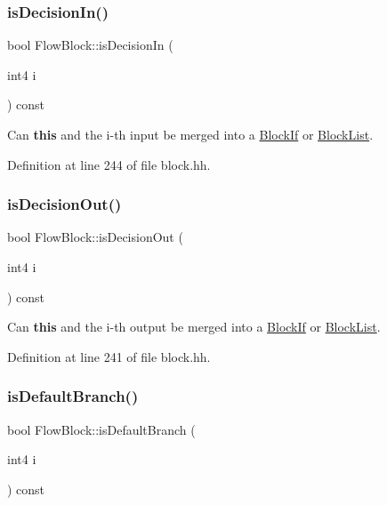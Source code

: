 \subsubsection{\texorpdfstring{isDecisionIn()}{isDecisionIn()}}
{\footnotesize\ttfamily bool Flow\+Block\+::is\+Decision\+In (\begin{DoxyParamCaption}\item[{int4}]{i }\end{DoxyParamCaption}) const\hspace{0.3cm}{\ttfamily [inline]}}



Can {\bfseries{this}} and the i-\/th input be merged into a \mbox{\hyperlink{class_block_if}{Block\+If}} or \mbox{\hyperlink{class_block_list}{Block\+List}}. 



Definition at line 244 of file block.\+hh.

\mbox{\label{class_flow_block_a96f1d86554ed27136413d992238356f1}} 
\subsubsection{\texorpdfstring{isDecisionOut()}{isDecisionOut()}}
{\footnotesize\ttfamily bool Flow\+Block\+::is\+Decision\+Out (\begin{DoxyParamCaption}\item[{int4}]{i }\end{DoxyParamCaption}) const\hspace{0.3cm}{\ttfamily [inline]}}



Can {\bfseries{this}} and the i-\/th output be merged into a \mbox{\hyperlink{class_block_if}{Block\+If}} or \mbox{\hyperlink{class_block_list}{Block\+List}}. 



Definition at line 241 of file block.\+hh.

\mbox{\label{class_flow_block_a597d04517618311c838f3c25bdbb02a9}} 
\subsubsection{\texorpdfstring{isDefaultBranch()}{isDefaultBranch()}}
{\footnotesize\ttfamily bool Flow\+Block\+::is\+Default\+Branch (\begin{DoxyParamCaption}\item[{int4}]{i }\end{DoxyParamCaption}) const\hspace{0.3cm}{\ttfamily [inline]}}



